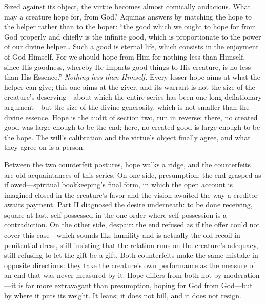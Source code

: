 Sized against its object, the virtue becomes almost comically audacious. What may a creature hope for, from God? Aquinas answers by matching the hope to the helper rather than to the hoper: ``the good which we ought to hope for from God properly and chiefly is the infinite good, which is proportionate to the power of our divine helper\ldots{} Such a good is eternal life, which consists in the enjoyment of God Himself. For we should hope from Him for nothing less than Himself, since His goodness, whereby He imparts good things to His creature, is no less than His Essence.'' \emph{Nothing less than Himself.} Every lesser hope aims at what the helper can give; this one aims at the giver, and its warrant is not the size of the creature's deserving---about which the entire series has been one long deflationary argument---but the size of the divine generosity, which is not smaller than the divine essence. Hope is the audit of section two, run in reverse: there, no created good was large enough to be the end; here, no created good is large enough to be the hope. The will's calibration and the virtue's object finally agree, and what they agree on is a person.

Between the two counterfeit postures, hope walks a ridge, and the counterfeits are old acquaintances of this series. On one side, presumption: the end grasped as if owed---spiritual bookkeeping's final form, in which the open account is imagined closed in the creature's favor and the vision awaited the way a creditor awaits payment. Part II diagnosed the desire underneath: to be done receiving, square at last, self-possessed in the one order where self-possession is a contradiction. On the other side, despair: the end refused as if the offer could not cover this case---which sounds like humility and is actually the old recoil in penitential dress, still insisting that the relation runs on the creature's adequacy, still refusing to let the gift be a gift. Both counterfeits make the same mistake in opposite directions: they take the creature's own performance as the measure of an end that was never measured by it. Hope differs from both not by moderation---it is far more extravagant than presumption, hoping for God from God---but by where it puts its weight. It leans; it does not bill, and it does not resign.

